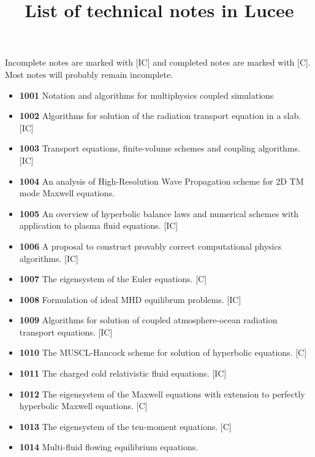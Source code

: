 \documentclass[11pt]{article}
\title{List of technical notes in Lucee}
\author{}
\date{}
\begin{document}
\maketitle

Incomplete notes are marked with [IC] and completed notes are marked
with [C]. Most notes will probably remain incomplete.

\begin{itemize}
\item {\bf 1001} Notation and algorithms for multiphysics coupled
  simulations
\item {\bf 1002} Algorithms for solution of the radiation transport
  equation in a slab. [IC]
\item {\bf 1003} Transport equations, finite-volume schemes and
  coupling algorithms. [IC]
\item {\bf 1004} An analysis of High-Resolution Wave Propagation
  scheme for 2D TM mode Maxwell equations.
\item {\bf 1005} An overview of hyperbolic balance laws and
  numerical schemes with application to plasma fluid equations. [IC]
\item {\bf 1006} A proposal to construct provably correct
  computational physics algorithms. [IC]
\item {\bf 1007} The eigensystem of the Euler equations. [C]
\item {\bf 1008} Formulation of ideal MHD equilibrum problems. [IC]
\item {\bf 1009} Algorithms for solution of coupled atmosphere-ocean
  radiation transport equations. [IC]
\item {\bf 1010} The MUSCL-Hancock scheme for solution of hyperbolic
  equations. [C]
\item {\bf 1011} The charged cold relativistic fluid equations. [IC]
\item {\bf 1012} The eigensystem of the Maxwell equations with
  extension to perfectly hyperbolic Maxwell equations. [C]
\item {\bf 1013} The eigensystem of the ten-moment equations. [C]
\item {\bf 1014} Multi-fluid flowing equilibrium equations.
\end{itemize}
\end{document}
